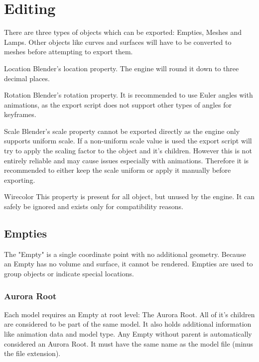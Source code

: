 \chapter{Editing}
There are three types of objects which can be exported: Empties,
Meshes and Lamps. Other objects like curves and surfaces will have to be
converted to meshes before attempting to export them.

\begin{propertyBlender}{Location}
    Blender's location property. The engine will round it down to three decimal places.
\end{propertyBlender} 

\begin{propertyBlender}{Rotation}
    Blender's rotation property. It is recommended to use Euler angles with animations, as the export script 
    does not support other types of angles for keyframes. 
\end{propertyBlender} 

\begin{propertyBlender}{Scale}
    Blender's scale property cannot be exported directly as the engine 
    only supports uniform scale. If a non-uniform scale value is used the export 
    script will try to apply the scaling factor to the object and it's children.
    However this is not entirely reliable and may cause issues especially with 
    animations. Therefore it is recommended to either keep the scale uniform or 
    apply it manually before exporting.
\end{propertyBlender}  

\begin{propertyAurora}{Wirecolor}
    This property is present for all object, but unused by the engine. It can safely be ignored 
    and exists only for compatibility reasons.
\end{propertyAurora}


\section{Empties}
The "Empty" is a single coordinate point with no additional geometry. Because an Empty has 
no volume and surface, it cannot be rendered. Empties are used to group objects or indicate 
special locations.


\subsection{Aurora Root}
\begin{minipage}[t]{0.55\textwidth}
    Each model requires an Empty at root level: The Aurora Root. All of it's children are 
    considered to be part of the same model. It also holds additional information like animation data 
    and model type. Any Empty without parent is automatically considered an Aurora Root. 
    It must have the same name as the model file (minus the file extension). 
\end{minipage}\hfill
\begin{minipage}[t]{0.4\textwidth}
    \centering{}
    \label{fig1}
\end{minipage}

